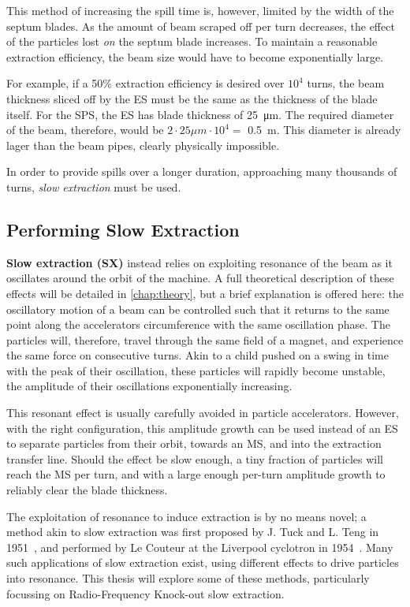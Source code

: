 \documentclass[11pt]{report}
\begin{document}
This method of increasing the spill time is, however, limited by the width of the septum blades. As the amount of beam scraped off per turn decreases, the effect of the particles lost \textit{on} the septum blade increases. To maintain a reasonable extraction efficiency, the beam size would have to become exponentially large.

For example, if a 50\% extraction efficiency is desired over $10^4$ turns, the beam thickness sliced off by the ES must be the same as the thickness of the blade itself. For the SPS, the ES has blade thickness of \qty{25}{\micro\meter}. The required diameter of the beam, therefore, would be $2\cdot 25\mu m\cdot 10^4 = $ \qty{0.5}{\meter}. This diameter is already lager than the beam pipes, clearly physically impossible.

In order to provide spills over a longer duration, approaching many thousands of turns, \textit{slow extraction} must be used. 

\subsection{Performing Slow Extraction}

\textbf{Slow extraction (SX)} instead relies on exploiting resonance of the beam as it oscillates around the orbit of the machine. A full theoretical description of these effects will be detailed in \autoref{chap:theory}, but a brief explanation is offered here: the oscillatory motion of a beam can be controlled such that it returns to the same point along the accelerators circumference with the same oscillation phase. The particles will, therefore, travel through the same field of a magnet, and experience the same force on consecutive turns. Akin to a child pushed on a swing in time with the peak of their oscillation, these particles will rapidly become unstable, the amplitude of their oscillations exponentially increasing. 

This resonant effect is usually carefully avoided in particle accelerators. However, with the right configuration, this amplitude growth can be used instead of an ES to separate particles from their orbit, towards an MS, and into the extraction transfer line. Should the effect be slow enough, a tiny fraction of particles will reach the MS per turn, and with a large enough per-turn amplitude growth to reliably clear the blade thickness.

The exploitation of resonance to induce extraction is by no means novel; a method akin to slow extraction was first proposed by J. Tuck and L. Teng in 1951~\cite{Couteur_1951}, and performed by Le Couteur at the Liverpool cyclotron in 1954~\cite{Couteur_1955}. Many such applications of slow extraction exist, using different effects to drive particles into resonance. This thesis will explore some of these methods, particularly focussing on Radio-Frequency Knock-out slow extraction.
\end{document}
